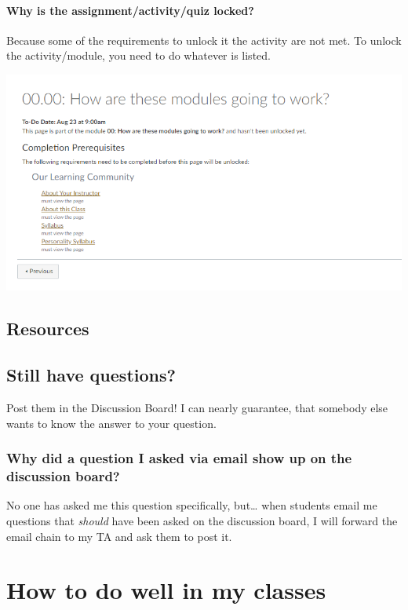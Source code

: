 \documentclass[
]{book}
\begin{document}
\hypertarget{why-is-the-assignmentactivityquiz-locked}{%
\subsubsection{Why is the assignment/activity/quiz locked?}\label{why-is-the-assignmentactivityquiz-locked}}

Because some of the requirements to unlock it the activity are not met. To unlock the activity/module, you need to do whatever is listed.

\begin{center}\includegraphics[width=0.5\linewidth]{img/requirements} \end{center}

\hypertarget{resources-1}{%
\section{Resources}\label{resources-1}}

\hypertarget{still-have-questions}{%
\section{Still have questions?}\label{still-have-questions}}

Post them in the Discussion Board! I can nearly guarantee, that somebody else wants to know the answer to your question.

\hypertarget{why-did-a-question-i-asked-via-email-show-up-on-the-discussion-board}{%
\subsection{Why did a question I asked via email show up on the discussion board?}\label{why-did-a-question-i-asked-via-email-show-up-on-the-discussion-board}}

No one has asked me this question specifically, but\ldots{} when students email me questions that \emph{should} have been asked on the discussion board, I will forward the email chain to my TA and ask them to post it.

\hypertarget{how-to-do-well-in-my-classes}{%
\chapter{How to do well in my classes}\label{how-to-do-well-in-my-classes}}
\end{document}
